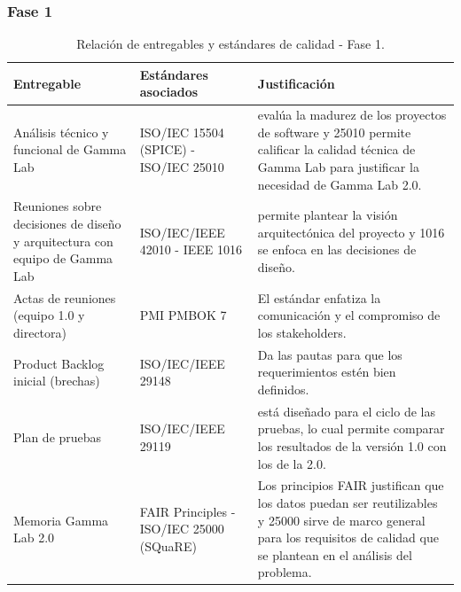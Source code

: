 \documentclass[12pt,letterpaper]{article}
\begin{document}
\subsubsection{Fase 1}
\begin{table}[H] %
\small
\centering
\renewcommand{\arraystretch}{1.4}
\begin{tabularx}{\textwidth}{|>{\hsize=0.7\hsize}X|>{\hsize=0.8\hsize}X|>{\hsize=1.5\hsize}X|}
\hline
\textbf{Entregable} & \textbf{Estándares asociados} & \textbf{Justificación} \\ \hline
Análisis técnico y funcional de Gamma Lab & ISO/IEC 15504 (SPICE) - ISO/IEC 25010 & 15504 evalúa la madurez de los proyectos de software y 25010 permite calificar la calidad técnica de Gamma Lab para justificar la necesidad de Gamma Lab 2.0. \\ \hline

Reuniones sobre decisiones de diseño y arquitectura con equipo de Gamma Lab & ISO/IEC/IEEE 42010 - IEEE 1016 & 42010 permite plantear la visión arquitectónica del proyecto y 1016 se enfoca en las decisiones de diseño. \\ \hline

Actas de reuniones (equipo 1.0 y directora) & PMI PMBOK 7 & El estándar enfatiza la comunicación y el compromiso de los stakeholders. \\ \hline

Product Backlog inicial (brechas) & ISO/IEC/IEEE 29148 & Da las pautas para que los requerimientos estén bien definidos. \\ \hline

Plan de pruebas & ISO/IEC/IEEE 29119 & 29119 está diseñado para el ciclo de las pruebas, lo cual permite comparar los resultados de la versión 1.0 con los de la 2.0. \\ \hline

Memoria Gamma Lab 2.0 & FAIR Principles - ISO/IEC 25000 (SQuaRE) & Los principios FAIR justifican que los datos puedan ser reutilizables y 25000 sirve de marco general para los requisitos de calidad que se plantean en el análisis del problema. \\ \hline
\end{tabularx}
\caption{Relación de entregables y estándares de calidad - Fase 1.}
\end{table}

\end{document}
